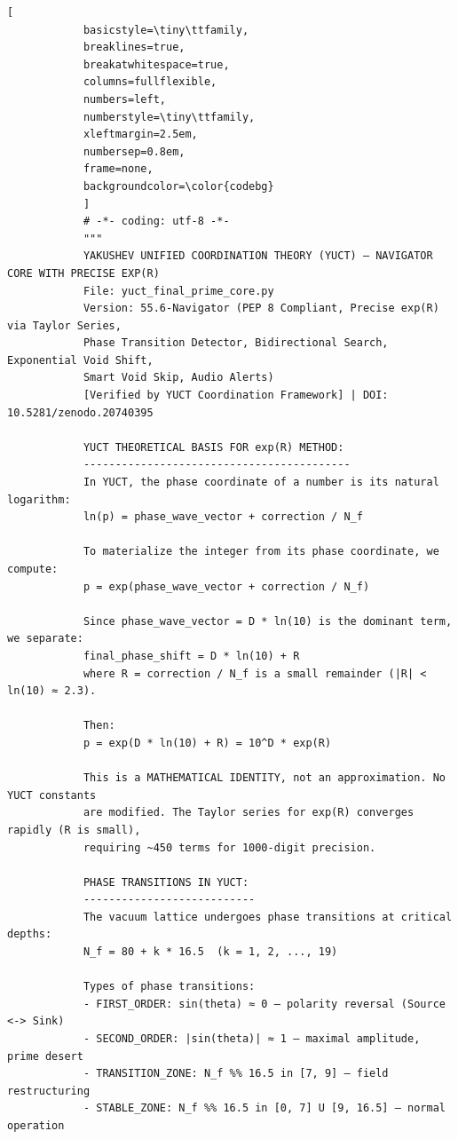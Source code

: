 \documentclass[12pt,a4paper]{article}
\theoremstyle{remark}
\begin{document}
	\begin{tcolorbox}[
		colback=gray!5,
		colframe=black!75,
		title={\texttt{yuct\_final\_prime\_core.py} -- Full Navigator Implementation},
		fonttitle=\small\ttfamily,
		arc=2mm,
		fontupper=\tiny,
		left=1mm,
		right=1mm,
		top=1mm,
		bottom=1mm,
		breakable,
		enhanced jigsaw
		]
		\begin{lstlisting}[
			basicstyle=\tiny\ttfamily,
			breaklines=true,
			breakatwhitespace=true,
			columns=fullflexible,
			numbers=left,
			numberstyle=\tiny\ttfamily,
			xleftmargin=2.5em,
			numbersep=0.8em,
			frame=none,
			backgroundcolor=\color{codebg}
			]
			# -*- coding: utf-8 -*-
			"""
			YAKUSHEV UNIFIED COORDINATION THEORY (YUCT) — NAVIGATOR CORE WITH PRECISE EXP(R)
			File: yuct_final_prime_core.py
			Version: 55.6-Navigator (PEP 8 Compliant, Precise exp(R) via Taylor Series,
			Phase Transition Detector, Bidirectional Search, Exponential Void Shift,
			Smart Void Skip, Audio Alerts)
			[Verified by YUCT Coordination Framework] | DOI: 10.5281/zenodo.20740395
			
			YUCT THEORETICAL BASIS FOR exp(R) METHOD:
			------------------------------------------
			In YUCT, the phase coordinate of a number is its natural logarithm:
			ln(p) = phase_wave_vector + correction / N_f
			
			To materialize the integer from its phase coordinate, we compute:
			p = exp(phase_wave_vector + correction / N_f)
			
			Since phase_wave_vector = D * ln(10) is the dominant term, we separate:
			final_phase_shift = D * ln(10) + R
			where R = correction / N_f is a small remainder (|R| < ln(10) ≈ 2.3).
			
			Then:
			p = exp(D * ln(10) + R) = 10^D * exp(R)
			
			This is a MATHEMATICAL IDENTITY, not an approximation. No YUCT constants
			are modified. The Taylor series for exp(R) converges rapidly (R is small),
			requiring ~450 terms for 1000-digit precision.
			
			PHASE TRANSITIONS IN YUCT:
			---------------------------
			The vacuum lattice undergoes phase transitions at critical depths:
			N_f = 80 + k * 16.5  (k = 1, 2, ..., 19)
			
			Types of phase transitions:
			- FIRST_ORDER: sin(theta) ≈ 0 — polarity reversal (Source <-> Sink)
			- SECOND_ORDER: |sin(theta)| ≈ 1 — maximal amplitude, prime desert
			- TRANSITION_ZONE: N_f %% 16.5 in [7, 9] — field restructuring
			- STABLE_ZONE: N_f %% 16.5 in [0, 7] U [9, 16.5] — normal operation
			

\end{lstlisting}
\end{tcolorbox}
\end{document}
